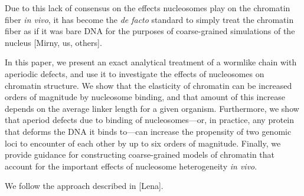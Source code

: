 \documentclass[%
 reprint,
superscriptaddress,
showpacs,preprintnumbers,
 amsmath,amssymb,
 aps,
 prl,
]{revtex4-1}
\begin{document}
Due to this lack of consensus on the effects nucleosomes play on the
    chromatin fiber \textit{in vivo}, it has become the \textit{de facto}
    standard to simply treat the chromatin fiber as if it was bare DNA for
    the purposes of coarse-grained simulations of the nucleus [Mirny, us,
    others].

In this paper, we present an exact analytical treatment of a wormlike chain
    with aperiodic defects, and use it to investigate the effects of nucleosomes
    on chromatin structure.
We show that the elasticity of chromatin can be increased orders of magnitude by
    nucleosome binding, and that amount of this increase depends on the average
    linker length for a given organism.
Furthermore, we show that aperiod defects due to binding of nucleosomes---or, in
    practice, any protein that deforms the DNA it binds to---can increase the
    propensity of two genomic loci to encounter of each other by up to six
    orders of magnitude.
Finally, we provide guidance for constructing coarse-grained models of chromatin
    that account for the important effects of nucleosome heterogeneity
    \textit{in vivo}.



We follow the approach described in [Lena].





\end{document}
